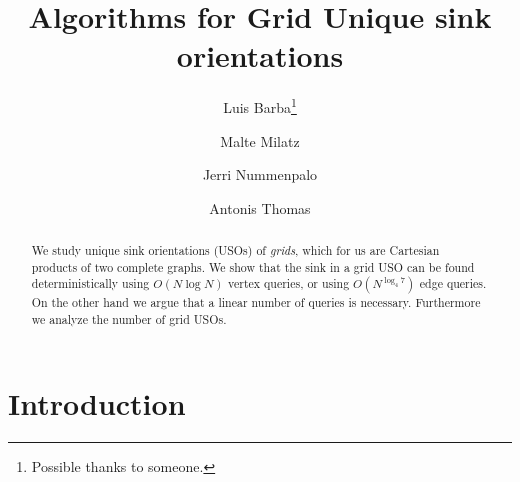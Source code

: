 \documentclass[runningheads,a4paper]{llncs}
\begin{document}
\mainmatter  %

\title{Algorithms for Grid Unique sink orientations}


%
%
\author{Luis Barba\thanks{Possible thanks to someone.} \and Malte Milatz \and Jerri Nummenpalo \and Antonis Thomas}%

%


%
%

\maketitle

\begin{abstract}
\noindent
    We study unique sink orientations (USOs) of \emph{grids}, which for us are
    Cartesian products of two complete graphs.
    We show that the sink in a grid USO can be found deterministically using
    $O(N \log N)$ vertex queries, or using $O(N^{\log_4 7})$ edge queries.
    On the other hand we argue that a linear number of queries is necessary.
    Furthermore we analyze the number of grid USOs.
\end{abstract}

\section{Introduction}
\end{document}
